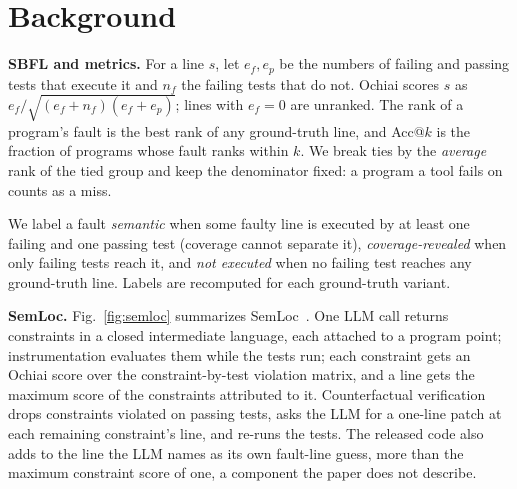 \section{Background}
\label{sec:background}

\textbf{SBFL and metrics.} For a line $s$, let $e_f, e_p$ be the numbers of failing and passing tests that execute it and
$n_f$ the failing tests that do not. Ochiai scores $s$ as $e_f/\sqrt{(e_f+n_f)(e_f+e_p)}$; lines with $e_f=0$ are
unranked. The rank of a program's fault is the best rank of any ground-truth line, and Acc@$k$ is the fraction of
programs whose fault ranks within $k$. We break ties by the \emph{average} rank of the tied group and keep the
denominator fixed: a program a tool fails on counts as a miss.

We label a fault \emph{semantic} when some faulty line is executed by at least one failing and
one passing test (coverage cannot separate it), \emph{coverage-revealed} when only failing tests reach it, and
\emph{not executed} when no failing test reaches any ground-truth line. Labels are recomputed for each ground-truth variant.

\textbf{SemLoc.} Fig.~\ref{fig:semloc} summarizes SemLoc~\cite{yang2026semloc}. One LLM call returns constraints in a
closed intermediate language, each attached to a program point; instrumentation evaluates them while the tests run;
each constraint gets an Ochiai score over the constraint-by-test violation matrix, and a line gets the maximum score of
the constraints attributed to it. Counterfactual verification drops constraints violated on passing tests, asks the
LLM for a one-line patch at each remaining constraint's line, and re-runs the tests. The released code also adds
\ConstPriorWeight{} to the line the LLM names as its own fault-line guess, more than the maximum constraint score of
one, a component the paper does not describe.

